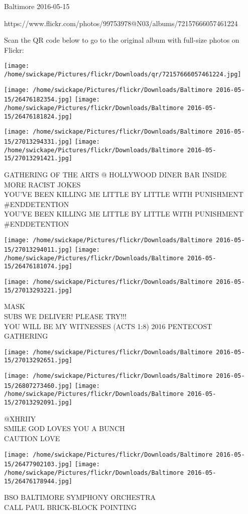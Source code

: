 \documentclass[10pt,letterpaper]{article}
\begin{document}
Baltimore 2016-05-15

https://www.flickr.com/photos/99753978@N03/albums/72157666057461224

Scan the QR code below to go to the original album with full-size photos on Flickr:

\texttt{[image: /home/swickape/Pictures/flickr/Downloads/qr/72157666057461224.jpg]}
\pagebreak

\texttt{[image: /home/swickape/Pictures/flickr/Downloads/Baltimore 2016-05-15/26476182354.jpg]}
\texttt{[image: /home/swickape/Pictures/flickr/Downloads/Baltimore 2016-05-15/26476181824.jpg]}

\texttt{[image: /home/swickape/Pictures/flickr/Downloads/Baltimore 2016-05-15/27013294331.jpg]}
\texttt{[image: /home/swickape/Pictures/flickr/Downloads/Baltimore 2016-05-15/27013291421.jpg]}

GATHERING OF THE ARTS @ HOLLYWOOD DINER BAR INSIDE\\
MORE RACIST JOKES\\
YOU'VE BEEN KILLING ME LITTLE BY LITTLE WITH PUNISHMENT \#ENDDETENTION\\
YOU'VE BEEN KILLING ME LITTLE BY LITTLE WITH PUNISHMENT \#ENDDETENTION
\pagebreak

\texttt{[image: /home/swickape/Pictures/flickr/Downloads/Baltimore 2016-05-15/27013294011.jpg]}
\texttt{[image: /home/swickape/Pictures/flickr/Downloads/Baltimore 2016-05-15/26476181074.jpg]}

\texttt{[image: /home/swickape/Pictures/flickr/Downloads/Baltimore 2016-05-15/27013293221.jpg]}

MASK\\
SUBS WE DELIVER!  PLEASE TRY!!!\\
YOU WILL BE MY WITNESSES (ACTS 1:8) 2016 PENTECOST GATHERING
\pagebreak

\texttt{[image: /home/swickape/Pictures/flickr/Downloads/Baltimore 2016-05-15/27013292651.jpg]}

\vspace{0.25in}
\texttt{[image: /home/swickape/Pictures/flickr/Downloads/Baltimore 2016-05-15/26807273460.jpg]}
\texttt{[image: /home/swickape/Pictures/flickr/Downloads/Baltimore 2016-05-15/27013292091.jpg]}

@XHRIIY\\
SMILE GOD LOVES YOU A BUNCH\\
CAUTION LOVE
\pagebreak

\texttt{[image: /home/swickape/Pictures/flickr/Downloads/Baltimore 2016-05-15/26477902103.jpg]}
\texttt{[image: /home/swickape/Pictures/flickr/Downloads/Baltimore 2016-05-15/26476178944.jpg]}

BSO BALTIMORE SYMPHONY ORCHESTRA\\
CALL PAUL BRICK{-}BLOCK POINTING
\pagebreak
\end{document}
